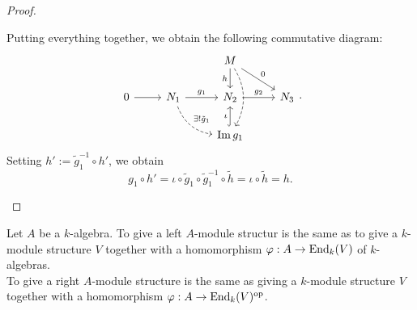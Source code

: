 \begin{proof}
\begin{itemize}
      Putting everything together, we obtain the following commutative diagram:
      \[
      \begin{tikzcd}
        &&M\ar[swap]{d}{h}\ar{rd}{0}\ar[bend left,dashed]{dd}&\\
        0\ar{r}&N_1\ar{r}{g_1}\ar[bend right,dashed]{dr}{\exists !\tilde{g}_1}&N_2\ar{r}{g_2}&N_3\\
        &&\im g_1\ar[hookrightarrow]{u}{\iota}&
      \end{tikzcd}.
      \]
      Setting $h':= \tilde{g}_1^{-1}\circ h'$, we obtain
      \[
      g_1\circ h' = \iota\circ \tilde{g}_1\circ \tilde{g}_1^{-1}\circ \tilde{h}= \iota \circ \tilde{h}= h.
      \]
    \end{itemize}
    \end{proof}
  \begin{prop}
    Let $A$ be a $k$-algebra. To give a left $A$-module structur is the same as to give a $k$-module structure $V$ together with a homomorphism $\varphi:A\to \operatorname{End}_k(V)$ of $k$-algebras.\\
    To give a right $A$-module structure is the same as giving a $k$-module structure $V$ together with a homomorphism $\varphi:A\to \operatorname{End}_k(V)^{\mathrm{op}}$.
  \end{prop}


